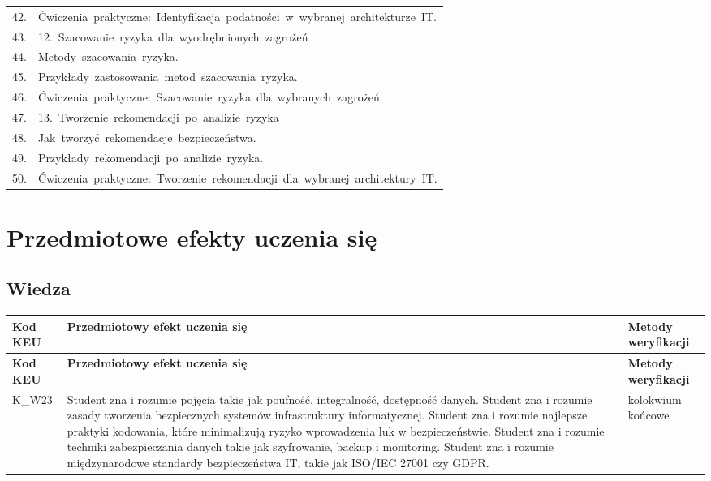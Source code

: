 \documentclass[12pt, a4paper]{article}
\newcommand{\thdrule}{\noalign{\global\setlength{\extrarowheight}{0pt}}}
\newcommand{\thdend}{\noalign{\global\setlength{\extrarowheight}{3pt}}}
\begin{document}
{\begin{longtable}{m{1.5cm}m{14.5cm}}
  \rowcolor{tableRowAlt} 42. & Ćwiczenia praktyczne: Identyfikacja podatności w wybranej architekturze IT. \\
  \rowcolor{tableRowLight} 43. & 12. Szacowanie ryzyka dla wyodrębnionych zagrożeń \\
  \rowcolor{tableRowAlt} 44. & Metody szacowania ryzyka. \\
  \rowcolor{tableRowLight} 45. & Przykłady zastosowania metod szacowania ryzyka. \\
  \rowcolor{tableRowAlt} 46. & Ćwiczenia praktyczne: Szacowanie ryzyka dla wybranych zagrożeń. \\
  \rowcolor{tableRowLight} 47. & 13. Tworzenie rekomendacji po analizie ryzyka \\
  \rowcolor{tableRowAlt} 48. & Jak tworzyć rekomendacje bezpieczeństwa. \\
  \rowcolor{tableRowLight} 49. & Przykłady rekomendacji po analizie ryzyka. \\
  \rowcolor{tableRowAlt} 50. & Ćwiczenia praktyczne: Tworzenie rekomendacji dla wybranej architektury IT. \\
\bottomrule
\end{longtable}}

\section{Przedmiotowe efekty uczenia się}

\subsection*{Wiedza}
{\scriptsize
\begin{longtable}{m{1.6cm}m{9.0cm}m{4.2cm}}
\thdrule\toprule
\rowcolor{pjatkRed} {\color{white}\footnotesize\textbf{\vphantom{Ag}Kod KEU}} & {\color{white}\footnotesize\textbf{\vphantom{Ag}Przedmiotowy efekt uczenia się}} & {\color{white}\footnotesize\textbf{\vphantom{Ag}Metody weryfikacji}} \\
\midrule\thdend
\endfirsthead
\thdrule\toprule
\rowcolor{pjatkRed} {\color{white}\footnotesize\textbf{\vphantom{Ag}Kod KEU}} & {\color{white}\footnotesize\textbf{\vphantom{Ag}Przedmiotowy efekt uczenia się}} & {\color{white}\footnotesize\textbf{\vphantom{Ag}Metody weryfikacji}} \\
\midrule\thdend
\endhead
  \rowcolor{tableRowLight} K\_W23 & Student zna i rozumie pojęcia takie jak poufność, integralność, dostępność danych. Student zna i rozumie zasady tworzenia bezpiecznych systemów infrastruktury informatycznej. Student zna i rozumie najlepsze praktyki kodowania, które minimalizują ryzyko wprowadzenia luk w bezpieczeństwie. Student zna i rozumie techniki zabezpieczania danych takie jak szyfrowanie, backup i monitoring. Student zna i rozumie międzynarodowe standardy bezpieczeństwa IT, takie jak ISO/IEC 27001 czy GDPR. & kolokwium końcowe \\
\bottomrule
\end{longtable}}
\end{document}
